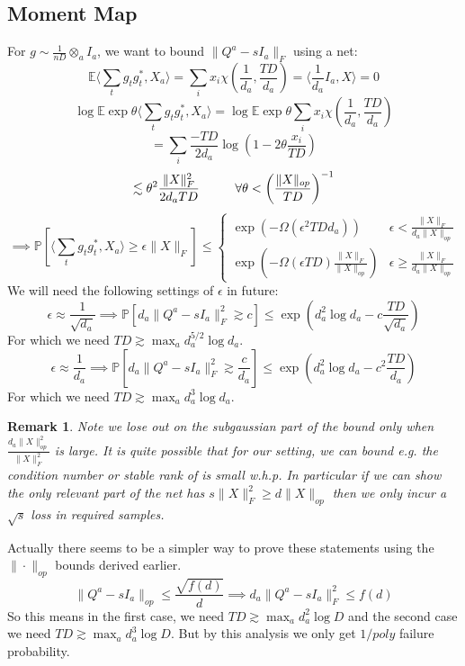 \documentclass{article}
\newtheorem{remark}{Remark}
\newcommand{\E}{\mathbb{E}}
\renewcommand{\Pr}{\mathbb{P}}
\begin{document}
\subsection{Moment Map}
For $g \sim \frac{1}{nD} \otimes_{a} I_{a}$, we want to bound $\|Q^{a} - sI_{a}\|_{F}$ using a net:
\[ \E \langle \sum_{t} g_{t} g_{t}^{*}, X_{a} \rangle = \sum_{i} x_{i} \chi(\frac{1}{d_{a}}, \frac{TD}{d_{a}}) = \langle \frac{1}{d_{a}} I_{a}, X \rangle = 0 \]
\[ \log \E \exp \theta \langle \sum_{t} g_{t} g_{t}^{*}, X_{a} \rangle = \log \E \exp \theta \sum_{i} x_{i} \chi(\frac{1}{d_{a}}, \frac{TD}{d_{a}})  \]
\[ = \sum_{i} \frac{-TD}{2 d_{a}} \log \left( 1 - 2 \theta \frac{x_{i}}{TD} \right)   \]
\[ \lesssim \theta^{2} \frac{\|X\|_{F}^{2}}{2 d_{a} TD} \hspace{10mm} \forall \theta < \left( \frac{\|X\|_{op}}{TD} \right)^{-1}  \]
\[ \implies \Pr[ \langle \sum_{t} g_{t} g_{t}^{*}, X_{a} \rangle \geq \epsilon \|X\|_{F} ] \leq 
\begin{cases} 
\exp( - \Omega(\epsilon^{2} TD d_{a}) ) & \epsilon  < \frac{\|X\|_{F}}{d_{a} \|X\|_{op}} 
\\ \exp ( - \Omega(\epsilon TD) \frac{\|X\|_{F}}{\|X\|_{op}} ) & \epsilon \geq \frac{\|X\|_{F}}{d_{a} \|X\|_{op}}
\end{cases}
\]
We will need the following settings of $\epsilon$ in future:
\[ \epsilon \approx \frac{1}{\sqrt{d_{a}}} \implies \Pr [ d_{a} \|Q^{a} - sI_{a}\|_{F}^{2} \gtrsim c ] \leq \exp(d_{a}^{2} \log d_{a} - c \frac{TD}{\sqrt{d_{a}}})  \]
For which we need $TD \gtrsim \max_{a} d_{a}^{5/2} \log d_{a}$.
\[ \epsilon \approx \frac{1}{d_{a}} \implies \Pr [ d_{a} \|Q^{a} - sI_{a}\|_{F}^{2} \gtrsim \frac{c}{d_{a}} ] \leq \exp(d_{a}^{2} \log d_{a} - c^{2} \frac{TD}{d_{a}})   \]
For which we need $TD \gtrsim \max_{a} d_{a}^{3} \log d_{a}$.

\begin{remark}
Note we lose out on the subgaussian part of the bound only when $\frac{d_{a} \|X\|_{op}^{2}}{\|X\|_{F}^{2}}$ is large. It is quite possible that for our setting, we can bound e.g. the condition number or stable rank of is small w.h.p. In particular if we can show the only relevant part of the net has $s \|X\|_{F}^{2} \geq d \|X\|_{op}$ then we only incur a $\sqrt{s}$ loss in required samples. 
\end{remark}

Actually there seems to be a simpler way to prove these statements using the $\|\cdot\|_{op}$ bounds derived earlier. 
\[ \|Q^{a} - sI_{a}\|_{op} \leq \frac{\sqrt{f(d)}}{d} \implies d_{a} \|Q^{a} - sI_{a}\|_{F}^{2} \leq f(d)  \]
So this means in the first case, we need $TD \gtrsim \max_{a} d_{a}^{2} \log D$ and the second case we need $TD \gtrsim \max_{a} d_{a}^{3} \log D$. But by this analysis we only get $1/poly$ failure probability. 
\end{document}
